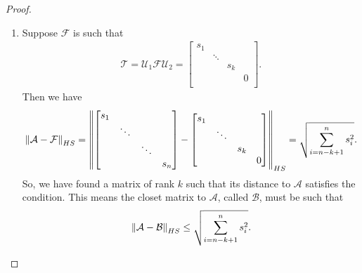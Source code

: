 \documentclass{book}
\theoremstyle{definition}
\newcommand{\F}{\mathcal{F}}
\newcommand{\Uni}{\mathcal{U}}
\newcommand{\A}{\mathcal{A}}
\newcommand{\B}{\mathcal{B}}
\newcommand{\T}{\mathcal{T}}
\begin{document}
\begin{proof}
\begin{enumerate}
		
		\item Suppose $\F$ is such that 
		\begin{align*}
		\T = \Uni_1\F\Uni_2 = \begin{bmatrix}
		s_1 & & &\\
		& \ddots& &\\
		& & s_k & \\
		&&&0\\
		\end{bmatrix}.
		\end{align*}
		Then we have
		\begin{align*}
		\norm{\A - \F}_{HS} = \norm{
		\begin{bmatrix}
		s_1 & & &\\
		& \ddots& &\\
		& & \ddots & \\
		&&&s_n\\
		\end{bmatrix}
		-
		\begin{bmatrix}
		s_1 & & &\\
		& \ddots& &\\
		& & s_k & \\
		&&&0\\
		\end{bmatrix}}_{HS} 
		= \sqrt{\sum_{i=n-k+1}^{n} s_i^2}.
		\end{align*}
		So, we have found a matrix of rank $k$ such that its distance to $\A$ satisfies the condition. This means the closet matrix to $\A$, called $\B$, must be such that
		\begin{align*}
		\norm{\A - \B}_{HS} \leq \sqrt{\sum_{i=n-k+1}^{n} s_i^2}.
		\end{align*}
		

\end{enumerate}
\end{proof}
\end{document}
